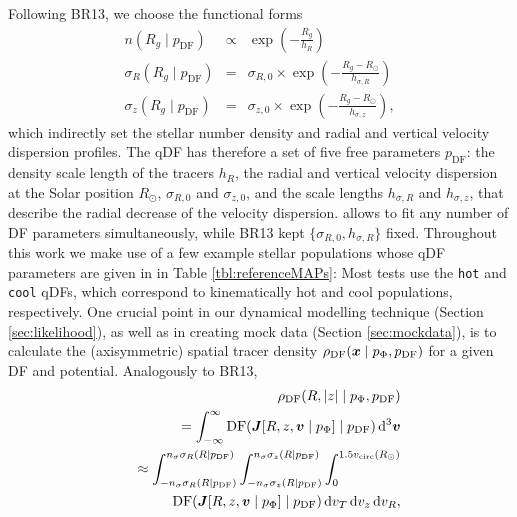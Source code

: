 Following BR13, we choose the functional forms
\begin{eqnarray}
n(R_g \mid p_\text{DF}) &\propto& \exp\left(-\frac{R_g}{h_R} \right)\\
\sigma_R(R_g \mid p_\text{DF}) &=& \sigma_{R,0} \times \exp\left(- \frac{R_g-R_\odot}{h_{\sigma,R}} \right)\label{eq:sigmaRRg}\\
\sigma_z(R_g \mid p_\text{DF}) &=& \sigma_{z,0} \times \exp\left(- \frac{R_g-R_\odot}{h_{\sigma,z}} \right)\label{eq:sigmazRg},
\end{eqnarray}
which indirectly set the stellar number density and radial and vertical velocity dispersion profiles. The qDF has therefore a set of five free parameters $p_\text{DF}$: the density scale length of the tracers $h_R$, the radial and vertical velocity dispersion at the Solar position $R_\odot$, $\sigma_{R,0}$ and $\sigma_{z,0}$, and the scale lengths $h_{\sigma,R}$ and $h_{\sigma,z}$, that describe the radial decrease of the velocity dispersion. \RM{} allows to fit any number of DF parameters simultaneously, while BR13 kept $\{\sigma_{R,0},h_{\sigma,R}\}$ fixed. Throughout this work we make use of a few example stellar populations whose qDF parameters are given in in Table \ref{tbl:referenceMAPs}: Most tests use the \texttt{hot} and \texttt{cool} qDFs, which correspond to kinematically hot and cool populations, respectively.
One crucial point in our dynamical modelling technique (Section \ref{sec:likelihood}), as well as in creating mock data (Section \ref{sec:mockdata}), is to calculate the (axisymmetric) spatial tracer density $\rho_\text{DF}(\boldsymbol{x} \mid p_{\Phi},p_\text{DF})$ for a given DF and potential. Analogously to BR13, 
\begin{eqnarray}
&&\rho_\text{DF}(R,|z| \mid p_{\Phi},p_\text{DF}) \nonumber\\
&&= \int_{-\infty}^{\infty} \text{DF}(\vect{J}[R,z,\vect{v} \mid p_{\Phi}] \mid p_\text{DF}) \Diff3\vect{v}  \nonumber\\%
&&\approx \int_{-n_\sigma \sigma_R(R \mid p_\text{DF})}^{n_\sigma \sigma_R(R \mid p_\text{DF})} \int_{-n_\sigma\sigma_z(R \mid p_\text{DF})}^{n_\sigma \sigma_z(R \mid p_\text{DF})} \int_{0}^{1.5 v_\text{circ}(R_\odot)}  \nonumber\\
& & \hspace{1cm} \text{DF}(\vect{J}[R,z,\vect{v} \mid p_{\Phi}] \mid p_\text{DF}) \diff v_T \diff v_z \diff v_R, \label{eq:tracerdensity}
\end{eqnarray}

